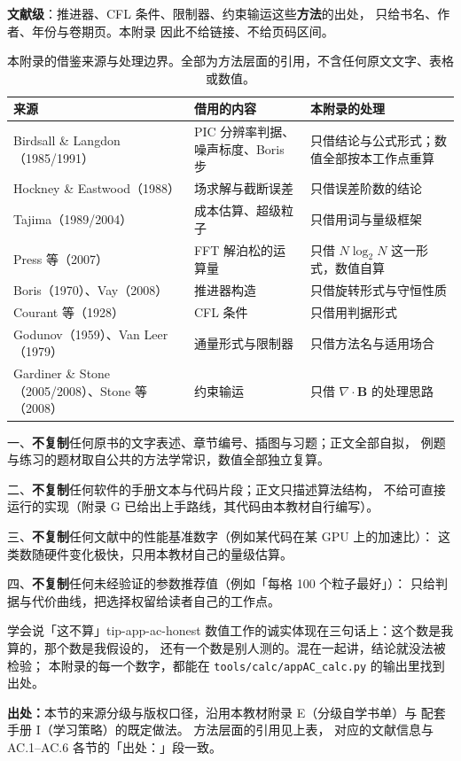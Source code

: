 \textbf{文献级}：推进器、CFL 条件、限制器、约束输运这些\textbf{方法}的出处，
只给书名、作者、年份与卷期页。本附录
因此不给链接、不给页码区间。

\begin{table}[htbp]
\centering
\small
\caption{本附录的借鉴来源与处理边界。全部为方法层面的引用，不含任何原文文字、表格或数值。}
\label{tab:app-ac-source}
\begin{tabular}{p{3.4cm}p{4.0cm}p{4.6cm}}
\toprule
来源 & 借用的内容 & 本附录的处理 \\
\midrule
Birdsall \& Langdon（1985/1991） & PIC 分辨率判据、噪声标度、Boris 步 & 只借结论与公式形式；数值全部按本工作点重算 \\
Hockney \& Eastwood（1988） & 场求解与截断误差 & 只借误差阶数的结论 \\
Tajima（1989/2004） & 成本估算、超级粒子 & 只借用词与量级框架 \\
Press 等（2007） & FFT 解泊松的运算量 & 只借 $N\log_2N$ 这一形式，数值自算 \\
Boris（1970）、Vay（2008） & 推进器构造 & 只借旋转形式与守恒性质 \\
Courant 等（1928） & CFL 条件 & 只借用判据形式 \\
Godunov（1959）、Van Leer（1979） & 通量形式与限制器 & 只借方法名与适用场合 \\
Gardiner \& Stone（2005/2008）、Stone 等（2008） & 约束输运 & 只借 $\nabla\cdot\mathbf{B}$ 的处理思路 \\
\bottomrule
\end{tabular}

\end{table}

一、\textbf{不复制}任何原书的文字表述、章节编号、插图与习题；正文全部自拟，
例题与练习的题材取自公共的方法学常识，数值全部独立复算。

二、\textbf{不复制}任何软件的手册文本与代码片段；正文只描述算法结构，
不给可直接运行的实现（附录 G 已给出上手路线，其代码由本教材自行编写）。

三、\textbf{不复制}任何文献中的性能基准数字（例如某代码在某 GPU 上的加速比）：
这类数随硬件变化极快，只用本教材自己的量级估算。

四、\textbf{不复制}任何未经验证的参数推荐值（例如「每格 100 个粒子最好」）：
只给判据与代价曲线，把选择权留给读者自己的工作点。

\begin{tip}{学会说「这不算」}{tip-app-ac-honest}
数值工作的诚实体现在三句话上：这个数是我算的，那个数是我假设的，
还有一个数是别人测的。混在一起讲，结论就没法被检验；
本附录的每一个数字，都能在 \texttt{tools/\allowbreak{}calc/\allowbreak{}appAC\_calc.py} 的输出里找到出处。
\end{tip}

\textbf{出处：}本节的来源分级与版权口径，沿用本教材附录 E（分级自学书单）与
配套手册 I（学习策略）的既定做法。
方法层面的引用见上表，
对应的文献信息与 AC.1--AC.6 各节的「出处：」段一致。
\endgroup